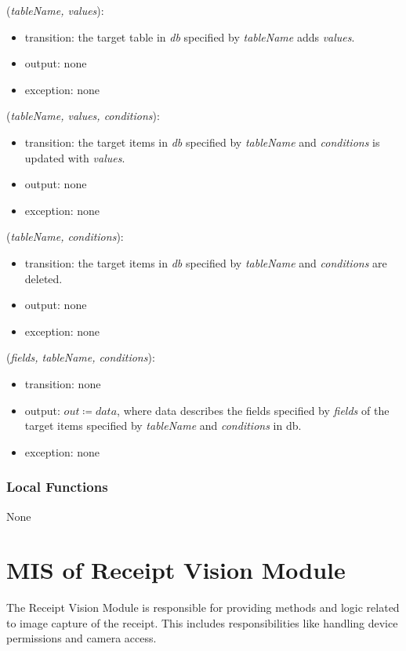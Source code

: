 \documentclass[12pt, titlepage]{article}
\begin{document}
\noindent {}(\textit{tableName, values}):
\begin{itemize}
\item transition: the target table in \textit{db} specified by \textit{tableName} adds \textit{values}.
\item output: none
\item exception: none
\end{itemize}

\noindent {}(\textit{tableName, values, conditions}):
\begin{itemize}
\item transition: the target items in \textit{db} specified by \textit{tableName} and \textit{conditions} is updated with \textit{values}.
\item output: none
\item exception: none
\end{itemize}

\noindent {}(\textit{tableName, conditions}):
\begin{itemize}
\item transition: the target items in \textit{db} specified by \textit{tableName} and \textit{conditions} are deleted.
\item output: none
\item exception: none
\end{itemize}

\noindent {}(\textit{fields, tableName, conditions}):
\begin{itemize}
\item transition: none
\item output: $out \coloneqq data$, where data describes the fields specified by \textit{fields} of the target items specified by \textit{tableName} and \textit{conditions} in db.
\item exception: none
\end{itemize}

\subsubsection{Local Functions}
None

\newpage

\section{MIS of Receipt Vision Module} \label{mVision}

The Receipt Vision Module is responsible for providing methods and logic related to image
capture of the receipt. This includes responsibilities like handling device permissions and camera access.
\end{document}
